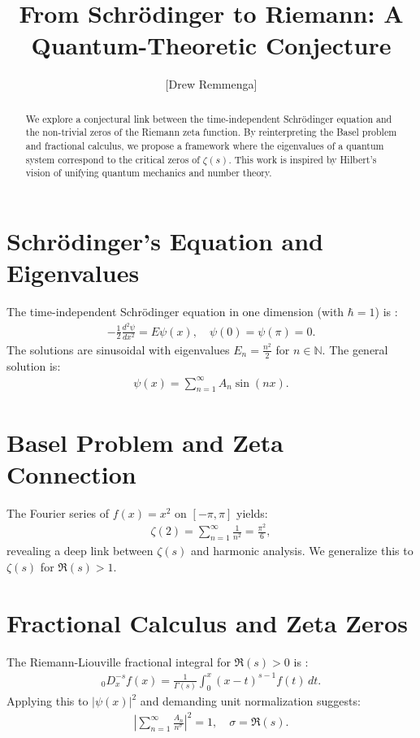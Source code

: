 \documentclass[10pt, oneside]{article}
\title{From Schrödinger to Riemann: A Quantum-Theoretic Conjecture}
\author{[Drew Remmenga]}
\newcommand{\N}{\mathbb{N}}
\begin{document}
\maketitle

\begin{abstract}
  We explore a conjectural link between the time-independent Schrödinger equation and the non-trivial zeros of the Riemann zeta function. By reinterpreting the Basel problem and fractional calculus, we propose a framework where the eigenvalues of a quantum system correspond to the critical zeros of $\zeta(s)$. This work is inspired by Hilbert's vision of unifying quantum mechanics and number theory.
\end{abstract}

\section{Schrödinger's Equation and Eigenvalues}
The time-independent Schrödinger equation in one dimension (with $\hbar = 1$) is \cite{Islam1994}:
\begin{align}
  -\frac{1}{2} \frac{d^2 \psi}{dx^2} = E \psi(x), \quad \psi(0) = \psi(\pi) = 0. \label{schrodinger}
\end{align}
The solutions are sinusoidal with eigenvalues $E_n = \frac{n^2}{2}$ for $n \in \N$. The general solution is:
\begin{align}
  \psi(x) = \sum_{n=1}^\infty A_n \sin(nx). \label{eq:wave}
\end{align}

\section{Basel Problem and Zeta Connection}
The Fourier series of $f(x) = x^2$ on $[-\pi, \pi]$ yields:
\begin{align}
  \zeta(2) = \sum_{n=1}^\infty \frac{1}{n^2} = \frac{\pi^2}{6}, \label{eq:basel}
\end{align}
revealing a deep link between $\zeta(s)$ and harmonic analysis. We generalize this to $\zeta(s)$ for $\Re(s) > 1$.

\section{Fractional Calculus and Zeta Zeros}
The Riemann-Liouville fractional integral for $\Re(s) > 0$ is \cite{Hadamard1892}:
\begin{align}
  _0D_x^{-s} f(x) = \frac{1}{\Gamma(s)} \int_0^x (x-t)^{s-1} f(t) \, dt. \label{Riemann-Liouville}
\end{align}
Applying this to $|\psi(x)|^2$ and demanding unit normalization suggests:
\begin{align}
  |\sum_{n=1}^\infty \frac{A_n}{n^{\sigma}}|^2 = 1, \quad \sigma = \Re(s). \label{eq:norm}
\end{align}
\end{document}
